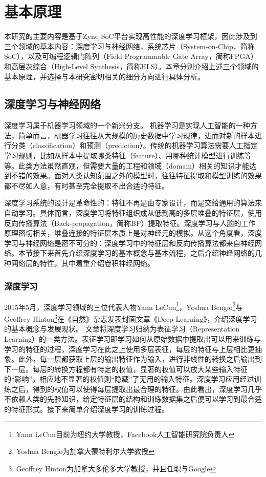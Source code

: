 
\chapter{基本原理}\label{sec:req}

本研究的主要内容是基于Zynq SoC平台实现高性能的深度学习框架，因此涉及到三个领域的基本内容：深度学习与神经网络，系统芯片（System-on-Chip，简称SoC），以及可编程逻辑门阵列（Field Programmable Gate Array，简称FPGA）和高层次综合（High-Level Synthesis，简称HLS）。本章分别介绍上述三个领域的基本原理，并选择与本研究密切相关的细分方向进行具体分析。

\section{深度学习与神经网络}

深度学习属于机器学习领域的一个新兴分支。
机器学习是实现人工智能的一种方法，简单而言，机器学习往往从大规模的历史数据中学习规律，进而对新的样本进行分类（classification）和预测（prediction）。传统的机器学习算法需要人工指定学习规则，比如从样本中提取哪类特征（feature）、用哪种统计模型进行训练等等。此类方法虽然直观，但需要大量的工程和领域（domain）相关的知识才能达到不错的效果。面对人类认知范围之外的模型时，往往特征提取和模型训练的效果都不尽如人意，有时甚至完全提取不出合适的特征。

深度学习系统的设计是革命性的：特征不再是由专家设计，而是交给通用的算法来自动学习。具体而言，深度学习将特征组织成从低到高的多层堆叠的特征层，使用反向传播算法（Back-propagation，简称BP）提取特征。深度学习与人脑的工作原理密切相关，堆叠连接的特征层本质上是对神经元的模拟。从这个角度看，深度学习与神经网络是密不可分的：深度学习中的特征层和反向传播算法都来自神经网络。本节接下来首先介绍深度学习的基本概念与基本流程，之后介绍神经网络的几种网络层的特性，其中着重介绍卷积神经网络。

\subsection{深度学习}

2015年5月，深度学习领域的三位代表人物Yann LeCun\footnote{Yann LeCun目前为纽约大学教授，Facebook人工智能研究院负责人}，Yoshua Bengio\footnote{Yoshua Bengio为加拿大蒙特利尔大学教授}与Geoffrey Hinton\footnote{Geoffrey Hinton为加拿大多伦多大学教授，并且任职与Google}在《自然》杂志发表封面文章《Deep Learning》\supercite{lecun2015deep}，介绍深度学习的基本概念与发展现状。
文章将深度学习归纳为表征学习（Representation Learning）\supercite{bengio2013representation}的一类方法。表征学习即学习如何从原始数据中提取出可以用来训练与学习的特征的过程，深度学习在此之上使用多层表征，每层的特征与上层相比更抽象。此外，每一层都获取上层的输出特征作为输入，进行非线性的转换之后输出到下一层。每层的转换方程都有特定的权值，显著的权值可以放大某些输入特征的“影响”，相应地不显著的权值则“隐藏”了无用的输入特征。深度学习应用经过训练之后，得到的权值可以使得每层提取出最合理的特征。由此看出，深度学习几乎不依赖人类的先验知识，给定特征层的结构和训练数据集之后便可以学习到最合适的特征形式。接下来简单介绍深度学习的训练过程。

